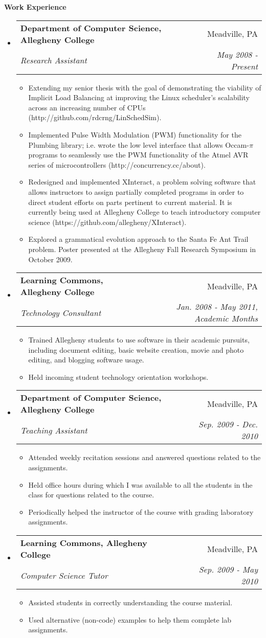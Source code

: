 \documentclass[letterpaper,12pt]{article}
\makeatletter
\newcommand{\resitem}[1]{\item #1 \vspace{-2pt}}
\newcommand{\resheading}[1]{{\large \colorbox{mygrey}{\begin{minipage}{\textwidth}{\textbf{#1 \vphantom{p\^{E}}}}\end{minipage}}}}
\newcommand{\ressubheading}[4]{
\begin{tabular*}{7.0in}{l@{\extracolsep{\fill}}r}
		\textbf{#1} & #2 \\
		\textit{#3} & \textit{#4} \\
\end{tabular*}\vspace{-6pt}}
\makeatother
\begin{document}
\resheading{Work Experience}
\begin{itemize}
\item
	\ressubheading{Department of Computer Science, Allegheny College}{Meadville, PA}{Research Assistant}{May 2008 - Present}
	\begin{itemize}
	    \resitem{Extending my senior thesis with the goal of demonstrating the viability of Implicit Load Balancing at improving the Linux scheduler's scalability across an increasing number of CPUs (http://github.com/rdcrng/LinSchedSim).}
		\resitem{Implemented Pulse Width Modulation (PWM) functionality for the Plumbing library; i.e. wrote the low level interface that allows Occam-$\pi$ programs to seamlessly use the PWM functionality of the Atmel AVR series of microcontrollers (http://concurrency.cc/about).}
		\resitem{Redesigned and implemented XInteract, a problem solving software that allows instructors to assign partially completed programs in order to direct student efforts on parts pertinent to current material. It is currently being used at Allegheny College to teach introductory computer science (https://github.com/allegheny/XInteract).}
		\resitem{Explored a grammatical evolution approach to the Santa Fe Ant Trail problem. Poster presented at the Allegheny Fall Research Symposium in October 2009.}
	\end{itemize}
	
\item
	\ressubheading{Learning Commons, Allegheny College}{Meadville, PA}{Technology Consultant}{Jan. 2008 - May 2011, Academic Months}
	\begin{itemize}
		\resitem{Trained Allegheny students to use software in their academic pursuits, including document editing, basic website creation, movie and photo editing, and blogging software usage.}
		\resitem{Held incoming student technology orientation workshops.}
	\end{itemize}

\item
	\ressubheading{Department of Computer Science, Allegheny College}{Meadville, PA}{Teaching Assistant}{Sep. 2009 - Dec. 2010}
	\begin{itemize}
		\resitem{Attended weekly recitation sessions and answered questions related to the assignments.}
		\resitem{Held office hours during which I was available to all the students in the class for questions related to the course.}
		\resitem{Periodically helped the instructor of the course with grading laboratory assignments.}
	\end{itemize}

\item
	\ressubheading{Learning Commons, Allegheny College}{Meadville, PA}{Computer Science Tutor}{Sep. 2009 - May 2010}
	\begin{itemize}
		\resitem{Assisted students in correctly understanding the course material.}
		\resitem{Used alternative (non-code) examples to help them complete lab assignments.}
	\end{itemize}
	
\end{itemize}
\end{document}
